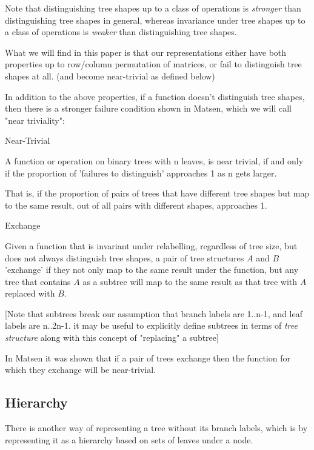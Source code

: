 \documentclass{report}
\begin{document}
Note that distinguishing tree shapes up to a class of operations is \emph{stronger} than distinguishing tree shapes in general, whereas invariance under tree shapes up to a class of operations is \emph{weaker} than distinguishing tree shapes.

What we will find in this paper is that our representations either have both properties up to row/column permutation of matrices, or fail to distinguish tree shapes at all. (and become near-trivial as defined below)

In addition to the above properties, if a function doesn't distinguish tree shapes, then there is a stronger failure condition shown in Matsen, which we will call "near triviality":

\begin{definition} Near-Trivial

	A function or operation on binary trees with n leaves, is near trivial, if and only if the proportion of 'failures to distinguish' approaches 1 as n gets larger.

	That is, if the proportion of pairs of trees that have different tree shapes but map to the same result, out of all pairs with different shapes, approaches 1.
\end{definition}

\begin{definition} Exchange

	Given a function that is invariant under relabelling, regardless of tree size, but does not always distinguish tree shapes, a pair of tree structures $A$ and $B$ 'exchange' if they not only map to the same result under the function, but any tree that contains $A$ as a subtree will map to the same result as that tree with $A$ replaced with $B$.
\end{definition}

[Note that subtrees break our assumption that branch labels are 1..n-1, and leaf labels are n..2n-1. it may be useful to explicitly define subtrees in terms of \emph{tree structure} along with this concept of "replacing" a subtree]

In Matsen it was shown that if a pair of trees exchange then the function for which they exchange will be near-trivial.  %

\subsection{Hierarchy}

There is another way of representing a tree without its branch labels, which is by representing it as a hierarchy based on sets of leaves under a node.
\end{document}
